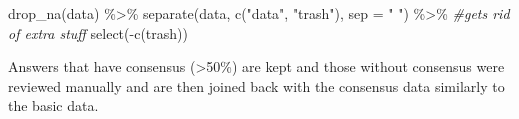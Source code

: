 \documentclass[
]{article}
\newenvironment{Shaded}{\begin{snugshade}}{\end{snugshade}}
\newcommand{\AttributeTok}[1]{\textcolor[rgb]{0.77,0.63,0.00}{#1}}
\newcommand{\CommentTok}[1]{\textcolor[rgb]{0.56,0.35,0.01}{\textit{#1}}}
\newcommand{\FunctionTok}[1]{\textcolor[rgb]{0.00,0.00,0.00}{#1}}
\newcommand{\NormalTok}[1]{#1}
\newcommand{\SpecialCharTok}[1]{\textcolor[rgb]{0.00,0.00,0.00}{#1}}
\newcommand{\StringTok}[1]{\textcolor[rgb]{0.31,0.60,0.02}{#1}}
\begin{document}
\begin{Shaded}
\begin{Highlighting}[]
  \FunctionTok{drop\_na}\NormalTok{(}\StringTok{\textquotesingle{}data\textquotesingle{}}\NormalTok{) }\SpecialCharTok{\%\textgreater{}\%}
  \FunctionTok{separate}\NormalTok{(data, }\FunctionTok{c}\NormalTok{(}\StringTok{"data"}\NormalTok{, }\StringTok{"trash"}\NormalTok{), }\AttributeTok{sep =} \StringTok{" "}\NormalTok{) }\SpecialCharTok{\%\textgreater{}\%}  \CommentTok{\#gets rid of extra stuff}
    \FunctionTok{select}\NormalTok{(}\SpecialCharTok{{-}}\FunctionTok{c}\NormalTok{(trash))}
\end{Highlighting}
\end{Shaded}

Answers that have consensus (\textgreater50\%) are kept and those
without consensus were reviewed manually and are then joined back with
the consensus data similarly to the basic data.
\end{document}
